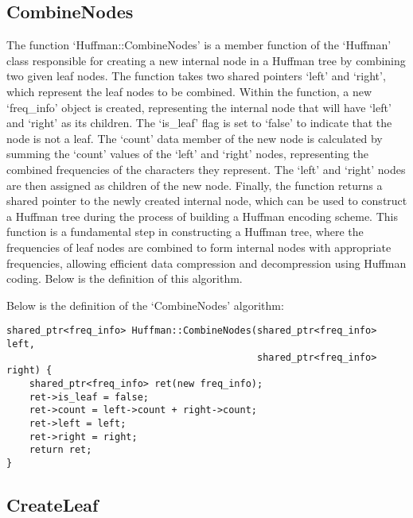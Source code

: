 \subsection*{CombineNodes}

The function `Huffman::CombineNodes' is a member function of the `Huffman' class responsible for creating a new internal node in a Huffman tree by combining two given leaf nodes. The function 
takes two shared pointers `left' and `right', which represent the leaf nodes to be combined. Within the function, a new `freq\_info' object is created, representing the internal node that will 
have `left' and `right' as its children. The `is\_leaf' flag is set to `false' to indicate that the node is not a leaf. The `count' data member of the new node is calculated by summing the `count' 
values of the `left' and `right' nodes, representing the combined frequencies of the characters they represent. The `left' and `right' nodes are then assigned as children of the new node. 
Finally, the function returns a shared pointer to the newly created internal node, which can be used to construct a Huffman tree during the process of building a Huffman encoding scheme. This 
function is a fundamental step in constructing a Huffman tree, where the frequencies of leaf nodes are combined to form internal nodes with appropriate frequencies, allowing efficient data 
compression and decompression using Huffman coding. Below is the definition of this algorithm.

\begin{highlight}

Below is the definition of the `CombineNodes' algorithm:

\horizontalline

\begin{verbatim}
shared_ptr<freq_info> Huffman::CombineNodes(shared_ptr<freq_info> left, 
                                            shared_ptr<freq_info> right) {
    shared_ptr<freq_info> ret(new freq_info);
    ret->is_leaf = false;
    ret->count = left->count + right->count;
    ret->left = left;
    ret->right = right;
    return ret;
}
\end{verbatim}

\end{highlight}

\subsection*{CreateLeaf}

